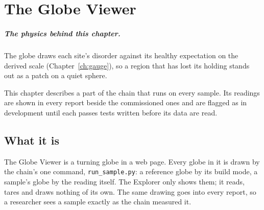 
\chapter{The Globe Viewer}\label{ch:explorer}

\paragraph{The physics behind this chapter.} The globe draws each site's disorder against its healthy expectation on the derived scale (Chapter~\ref{ch:gauge}), so a region that has lost its holding stands out as a patch on a quiet sphere.

\indevelopment{} This chapter describes a part of the chain that runs on every sample. Its readings are shown in every report beside the commissioned ones and are flagged as in development until each passes tests written before its data are read.

\section{What it is}

The Globe Viewer is a turning globe in a web page. Every globe in it is drawn by the chain's one command,
\texttt{run\_sample.py}: a reference globe by its build mode, a sample's globe by the reading itself. The Explorer only shows them;
it reads, tares and draws nothing of its own. The same drawing goes into every report, so a researcher sees a sample exactly as the
chain measured it.

